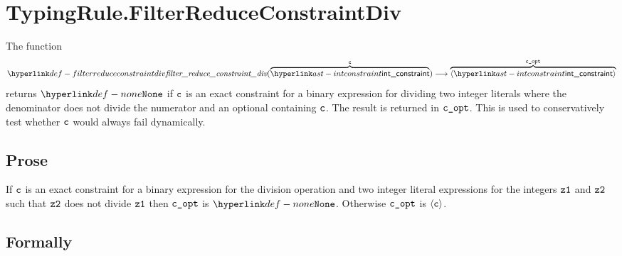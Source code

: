 \begin{mathpar}
\end{mathpar}

\begin{mathpar}
\end{mathpar}

\section{TypingRule.FilterReduceConstraintDiv \label{sec:TypingRule.FilterReduceConstraintDiv}}
\hypertarget{def-filterreduceconstraintdiv}{}
The function
\[
\filterreduceconstraintdiv(\overname{\intconstraint}{\vc}) \aslto \overname{\langle\intconstraint\rangle}{\vcopt}
\]
returns $\None$ if $\vc$ is an exact constraint for a binary expression for dividing two integer literals
where the denominator does not divide the numerator and an optional containing $\vc$.
The result is returned in $\vcopt$.
This is used to conservatively test whether $\vc$ would always fail dynamically.

\subsection{Prose}
If $\vc$ is an exact constraint for a binary expression for the division operation and two integer literal
expressions for the integers $\vzone$ and $\vztwo$ such that $\vztwo$ does not divide $\vzone$ then
$\vcopt$ is $\None$. Otherwise $\vcopt$ is $\langle\vc\rangle$.

\subsection{Formally}
\begin{mathpar}
\end{mathpar}

